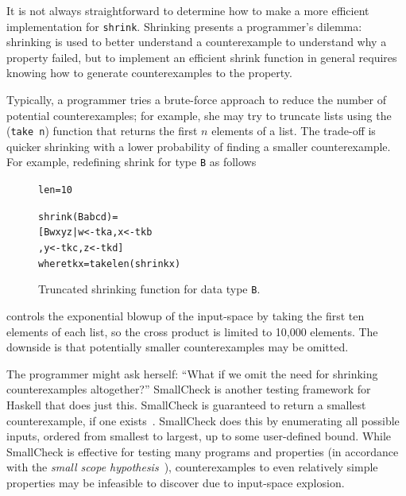 \documentclass[10pt]{sigplanconf}
\newenvironment{code}{\begin{alltt}}{\end{alltt}}
\newcommand{\ttp}[1]{\texttt{#1}}
\begin{document}
It is not always straightforward to determine how to make a more efficient
implementation for \ttp{shrink}.  Shrinking presents a programmer's dilemma:
shrinking is used to better understand a counterexample to understand why a
property failed, but to implement an efficient shrink function in general
requires knowing how to generate counterexamples to the property.

Typically, a programmer tries a brute-force approach to reduce the number of
potential counterexamples; for example, she may try to truncate lists using the
(\ttp{take n}) function that returns the first $n$ elements of a list.  The
trade-off is quicker shrinking with a lower probability of finding a smaller
counterexample.  For example, redefining shrink for type \ttp{B} as follows
%


\begin{figure}[ht]
\begin{code}
len = 10

shrink (B a b c d) =
  [ B w x y z | w <- tk a, x <- tk b
              , y <- tk c, z <- tk d ]
  where tk x = take len (shrink x)
\end{code}
  \caption{Truncated shrinking function for data type \ttp{B}.}
  \label{lst:newshrink}
\end{figure}

%
\noindent
controls the exponential blowup of the input-space by taking the first ten
elements of each list, so the cross product is limited to 10,000 elements.  The
downside is that potentially smaller counterexamples may be omitted.

The programmer might ask herself: ``What if we omit the need for shrinking
counterexamples altogether?''  SmallCheck is another testing framework for
Haskell that does just this.  SmallCheck is guaranteed to return a smallest
counterexample, if one exists~\cite{sc}.  SmallCheck does this by enumerating
all possible inputs, ordered from smallest to largest, up to some user-defined
bound.  While SmallCheck is effective for testing many programs and properties
(in accordance with the \emph{small scope hypothesis}~\cite{jackson}),
counterexamples to even relatively simple properties may be infeasible to
discover due to input-space explosion.
\end{document}
